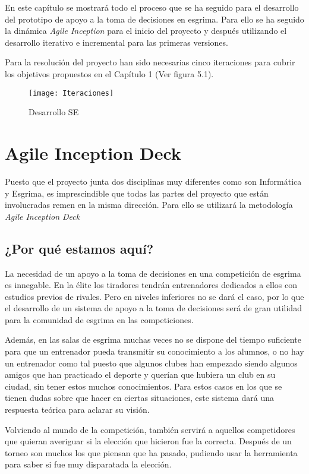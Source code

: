 En este capítulo se mostrará todo el proceso que se ha seguido para el desarrollo del prototipo
de apoyo a la toma de decisiones en esgrima. Para ello se ha seguido la dinámica \textit{Agile Inception}
para el inicio del proyecto y después utilizando el desarrollo iterativo e incremental para
las primeras versiones.

Para la resolución del proyecto han sido necesarias cinco iteraciones para cubrir
los objetivos propuestos en el Capítulo 1 (Ver figura 5.1).

\begin{figure}[htb]
  \centering
    \texttt{[image: Iteraciones]}
  \caption[Desarrollo SE]{Desarrollo SE}
  \label{fig:Desarrollo Sistema Experto}
\end{figure}

\section{Agile Inception Deck}

Puesto que el proyecto junta dos disciplinas muy diferentes como son Informática y Esgrima,
es imprescindible que todas las partes del proyecto que están involucradas remen en la misma
dirección. Para ello se utilizará la metodología \textit{Agile Inception Deck}

\subsection{¿Por qué estamos aquí?}
La necesidad de un apoyo a la toma de decisiones en una competición de esgrima es innegable.
En la élite los tiradores tendrán entrenadores dedicados a ellos con estudios previos de rivales.
Pero en niveles inferiores no se dará el caso, por lo que el desarrollo de un sistema de
apoyo a la toma de decisiones será de gran utilidad para la comunidad de esgrima en las
competiciones.

Además, en las salas de esgrima muchas veces no se dispone del tiempo suficiente para que un
entrenador pueda transmitir su conocimiento a los alumnos, o no hay un entrenador como tal
puesto que algunos clubes han empezado siendo algunos amigos que han practicado el deporte
y querían que hubiera un club en su ciudad, sin tener estos muchos conocimientos. Para estos
casos en los que se tienen dudas sobre que hacer en ciertas situaciones, este sistema
dará una respuesta teórica para aclarar su visión.

Volviendo al mundo de la competición, también servirá a aquellos competidores que quieran
averiguar si la elección que hicieron fue la correcta. Después de un torneo son muchos
los que piensan que ha pasado, pudiendo usar la herramienta para saber si fue muy
disparatada la elección.

